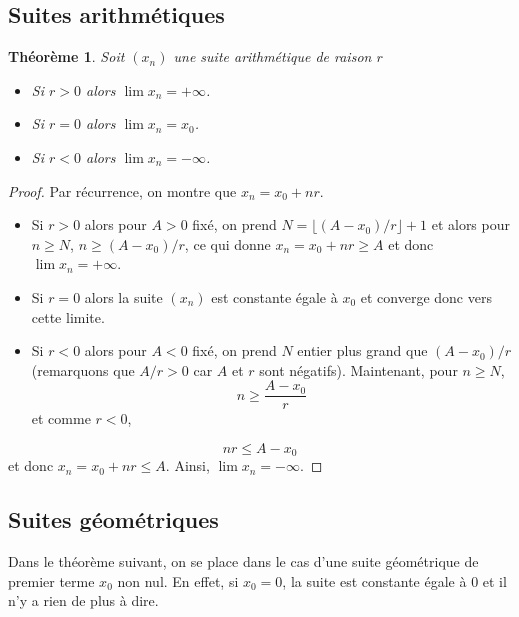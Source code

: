 \documentclass[
]{book}
\providecommand{\tightlist}{%
  \setlength{\itemsep}{0pt}\setlength{\parskip}{0pt}}
\newtheorem{theorem}{Théorème}[chapter]
\theoremstyle{definition}
\theoremstyle{definition}
\theoremstyle{definition}
\theoremstyle{definition}
\theoremstyle{remark}
\begin{document}
\hypertarget{suites-arithmuxe9tiques}{%
\subsection{Suites arithmétiques}\label{suites-arithmuxe9tiques}}

\begin{theorem}

Soit \((x_n)\) une suite arithmétique de raison \(r\)

\begin{itemize}
\tightlist
\item
  Si \(r>0\) alors \(\lim x_n=+\infty\).
\item
  Si \(r=0\) alors \(\lim x_n=x_0\).
\item
  Si \(r<0\) alors \(\lim x_n=-\infty\).
\end{itemize}

\end{theorem}

\begin{proof}
Par récurrence, on montre que \(x_n=x_0+nr\).

\begin{itemize}
\tightlist
\item
  Si \(r>0\) alors pour \(A>0\) fixé, on prend \(N=\lfloor (A-x_0)/r\rfloor+1\) et alors pour \(n\geq N\), \(n\geq (A-x_0)/r\), ce qui donne \(x_n=x_0+nr\geq A\) et donc \(\lim x_n=+\infty\).
\item
  Si \(r=0\) alors la suite \((x_n)\) est constante égale à \(x_0\) et converge donc vers cette limite.
\item
  Si \(r<0\) alors pour \(A<0\) fixé, on prend \(N\) entier plus grand que \((A-x_0)/r\) (remarquons que \(A/r>0\) car \(A\) et \(r\) sont négatifs). Maintenant, pour \(n\geq N\), \[n\geq \frac{A-x_0}{r}\] et comme \(r<0\),
\end{itemize}

\[nr\leq A-x_0\]
et donc \(x_n=x_0+nr\leq A\). Ainsi, \(\lim x_n=-\infty\).
\end{proof}

\hypertarget{suites-guxe9omuxe9triques}{%
\subsection{Suites géométriques}\label{suites-guxe9omuxe9triques}}

Dans le théorème suivant, on se place dans le cas d'une suite géométrique de premier terme \(x_0\) non nul. En effet, si \(x_0=0\), la suite est constante égale à 0 et il n'y a rien de plus à dire.
\end{document}
